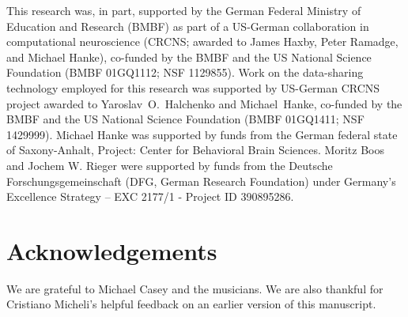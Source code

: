 This research was, in part, supported by the German Federal Ministry of
Education and Research (BMBF) as part of a US-German collaboration in
computational neuroscience (CRCNS; awarded to James Haxby, Peter Ramadge, and
Michael Hanke), co-funded by the BMBF and the US National Science Foundation
(BMBF 01GQ1112; NSF 1129855).  Work on the data-sharing technology employed for
this research was supported by US-German CRCNS project awarded to
Yaroslav~O.~Halchenko and Michael~Hanke, co-funded by the BMBF and the US
National Science Foundation (BMBF 01GQ1411; NSF 1429999).  Michael Hanke was
supported by funds from the German federal state of Saxony-Anhalt, Project:
Center for Behavioral Brain Sciences.
Moritz Boos and Jochem W. Rieger were supported by funds from the Deutsche Forschungsgemeinschaft (DFG, German Research Foundation) under Germany's Excellence Strategy – EXC 2177/1 - Project ID 390895286.

\section*{Acknowledgements}

We are grateful to Michael Casey and the musicians.
We are also thankful for Cristiano Micheli's helpful feedback on an earlier version of this manuscript.



\beginsupplement
\newpage
